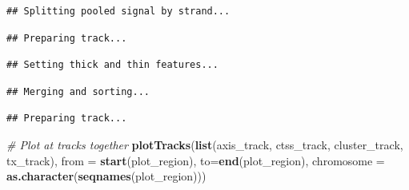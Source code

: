 \documentclass[9pt,a4paper,]{extarticle}
\newenvironment{Shaded}{\begin{snugshade}}{\end{snugshade}}
\newcommand{\KeywordTok}[1]{\textcolor[rgb]{0.13,0.29,0.53}{\textbf{{#1}}}}
\newcommand{\DataTypeTok}[1]{\textcolor[rgb]{0.13,0.29,0.53}{{#1}}}
\newcommand{\StringTok}[1]{\textcolor[rgb]{0.31,0.60,0.02}{{#1}}}
\newcommand{\CommentTok}[1]{\textcolor[rgb]{0.56,0.35,0.01}{\textit{{#1}}}}
\newcommand{\OtherTok}[1]{\textcolor[rgb]{0.56,0.35,0.01}{{#1}}}
\newcommand{\NormalTok}[1]{{#1}}
\begin{document}
\begin{verbatim}
## Splitting pooled signal by strand...
\end{verbatim}

\begin{verbatim}
## Preparing track...
\end{verbatim}

\begin{Shaded}
\end{Shaded}

\begin{verbatim}
## Setting thick and thin features...
\end{verbatim}

\begin{verbatim}
## Merging and sorting...
\end{verbatim}

\begin{verbatim}
## Preparing track...
\end{verbatim}

\begin{Shaded}
\begin{Highlighting}[]
\CommentTok{# Plot at tracks together}
\KeywordTok{plotTracks}\NormalTok{(}\KeywordTok{list}\NormalTok{(axis_track, }
                \NormalTok{ctss_track,}
                \NormalTok{cluster_track,}
                \NormalTok{tx_track),}
           \DataTypeTok{from =} \KeywordTok{start}\NormalTok{(plot_region), }
           \DataTypeTok{to=}\KeywordTok{end}\NormalTok{(plot_region), }
           \DataTypeTok{chromosome =} \KeywordTok{as.character}\NormalTok{(}\KeywordTok{seqnames}\NormalTok{(plot_region)))}
\end{Highlighting}
\end{Shaded}
\end{document}
